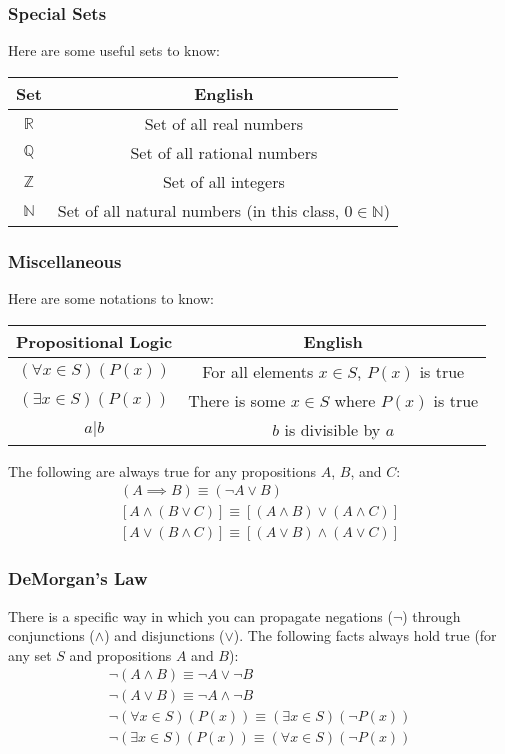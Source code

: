 \documentclass{beamer}
\begin{document}
\begin{frame}
    \frametitle{Special Sets}
    Here are some useful sets to know:
    \begin{center}
        \begin{tabular}{c|c}
            Set & English\\
            \hline
            $\mathbb{R}$ & Set of all real numbers\\
            $\mathbb{Q}$ & Set of all rational numbers\\
            $\mathbb{Z}$ & Set of all integers\\
            $\mathbb{N}$ & Set of all natural numbers (in this class, $0\in\mathbb{N}$)
        \end{tabular}
    \end{center}
\end{frame}

\begin{frame}
    \frametitle{Miscellaneous}
    Here are some notations to know:
    \begin{center}
        \begin{tabular}{c|c}
            Propositional Logic & English\\
            \hline
            $(\forall x\in S)(P(x))$ & For all elements $x\in S$, $P(x)$ is true\\
            $(\exists x\in S)(P(x))$ & There is some $x\in S$ where $P(x)$ is true\\
            $a\vert b$ & $b$ is divisible by $a$
        \end{tabular}
    \end{center}
    The following are always true for any propositions $A$, $B$, and $C$:
    \begin{gather*}
        (A\implies B)\equiv(\neg A\vee B)\\
        [A\wedge (B\vee C)]\equiv[(A\wedge B)\vee(A\wedge C)]\\
        [A\vee (B\wedge C)]\equiv[(A\vee B)\wedge(A\vee C)]
    \end{gather*}
\end{frame}

\begin{frame}
    \frametitle{DeMorgan's Law}
    There is a specific way in which you can propagate negations ($\neg$) through conjunctions ($\wedge$) and disjunctions ($\vee$). The following facts always hold true (for any set $S$ and propositions $A$ and $B$):
    \begin{gather*}
        \neg(A\wedge B)\equiv\neg A\vee\neg B\\
        \neg(A\vee B)\equiv\neg A\wedge\neg B\\
        \neg(\forall x\in S)(P(x))\equiv(\exists x\in S)(\neg P(x))\\
        \neg(\exists x\in S)(P(x))\equiv(\forall x\in S)(\neg P(x))
    \end{gather*}

\end{frame}
\end{document}
